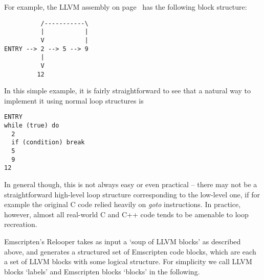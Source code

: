 \documentclass[11pt]{proc}
\begin{document}
For example, the LLVM assembly on page~\pageref{code:examplellvm} has the following block
structure:
\begin{verbatim}
          /-----------\
          |           |
          V           |
ENTRY --> 2 --> 5 --> 9
          |
          V
         12
\end{verbatim}
In this simple example, it is fairly straightforward to see that a natural way to implement it
using normal loop structures is
\begin{verbatim}
ENTRY
while (true) do
  2
  if (condition) break
  5
  9
12
\end{verbatim}
In general though, this is not always easy or even practical -- there may
not be a straightforward high-level loop structure corresponding to the low-level one, if
for example the original C code relied heavily on \emph{goto} instructions.
In practice, however, almost all real-world C and C++ code tends to
be amenable to loop recreation.

Emscripten's Relooper takes as input a `soup of LLVM blocks' as described above,
and generates a structured set of Emscripten code blocks, which are each a set of LLVM blocks
with some logical structure. For simplicity we call LLVM blocks `labels' and Emscripten
blocks `blocks' in the following.
\end{document}
